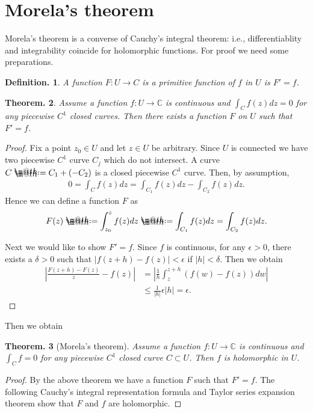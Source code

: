 \documentclass[openany, a4paper, oneside]{jsbook}
\makeatletter
\newcommand*{\defeq}{\mathrel{\rlap{%
\raisebox{0.3ex}{$\m@th\cdot$}}%
\raisebox{-0.3ex}{$\m@th\cdot$}}%
=}
\theoremstyle{break}
\newtheorem{thm}{Theorem.}[section]
\theoremstyle{breakdefn}
\newtheorem{defn}[thm]{Definition.}
\newcommand{\abs}[1]{\left|#1\right|}
\newcommand{\rbk}[1]{\left (#1\right)}
\newcommand{\bbC}{\mathbb{C}}
\makeatother
\begin{document}
\section{Morela's theorem}


Morela's theorem is a converse of Cauchy's integral theorem:
i.e., differentiablity and integrability coincide for holomorphic functions.
For proof we need some preparations.
\begin{defn}
 A function $F \colon U \to C$ is a primitive function of $f$ in $U$ is $F' = f$.
\end{defn}
\begin{thm}
 Assume a function $f \colon U \to \bbC$ is continuous and $\int_C f (z) dz = 0$ for any piecewise $C^1$ closed curves.
 Then there exists a function $F$ on $U$ such that $F' = f$.
\end{thm}
\begin{proof}
Fix a point $z_0 \in U$ and let $z \in U$ be arbitrary.
Since $U$ is connected we have two piecewise $C^1$ curve $C_j$ which do not intersect.
A curve $C \defeq C_1 + (- C_2)$ is a closed piecewise $C^1$ curve.
Then, by assumption,
\begin{align}
 0
 =
 \int_C f (z) dz
 =
 \int_{C_1} f (z) dz - \int_{C_2} f (z) dz.
\end{align}
Hence we can define a function $F$ as
\begin{align}
 F (z)
 \defeq
 \int_{z_0}^{z} f (z) dz
 \defeq
 \int_{C_1} f (z) dz = \int_{C_2} f (z) dz.
\end{align}

Next we would like to show $F' = f$.
Since $f$ is continuous, for any $\epsilon > 0$, there exists a $\delta > 0$ such that $\abs{f (z+h) - f (z)} < \epsilon$ if $\abs{h} < \delta$.
Then we obtain
 \begin{align}
  \abs{\frac{F (z+h) - F (z)}{z} - f (z)}
  &=
  \abs{\frac{1}{h}\int_{z}^{z+h} \rbk{f (w) - f (z)} dw} \\
  &\leq
  \frac{1}{\abs{h}} \epsilon \abs{h} = \epsilon.
  \end{align}
\end{proof}

Then we obtain
\begin{thm}[Morela's theorem]
 Assume a function $f \colon U \to \bbC$ is continuous and $\int_C f = 0$ for any piecewise $C^1$ closed curve $C \subset U$.
 Then $f$ is holomorphic in $U$.
\end{thm}
\begin{proof}
By the above theorem we have a function $F$ such that $F' = f$.
The following Cauchy's integral representation formula and Taylor series expansion theorem show that $F$ and $f$ are holomorphic.
\end{proof}
\end{document}
